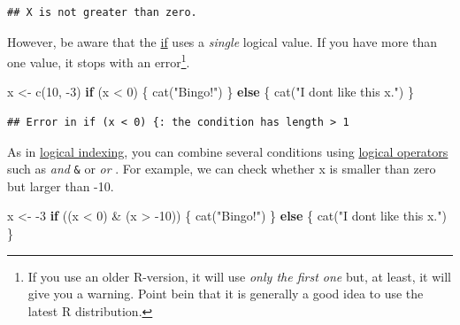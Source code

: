 \documentclass[
]{book}
\newenvironment{Shaded}{\begin{snugshade}}{\end{snugshade}}
\newcommand{\ControlFlowTok}[1]{\textcolor[rgb]{0.13,0.29,0.53}{\textbf{#1}}}
\newcommand{\DecValTok}[1]{\textcolor[rgb]{0.00,0.00,0.81}{#1}}
\newcommand{\FunctionTok}[1]{\textcolor[rgb]{0.00,0.00,0.00}{#1}}
\newcommand{\NormalTok}[1]{#1}
\newcommand{\OtherTok}[1]{\textcolor[rgb]{0.56,0.35,0.01}{#1}}
\newcommand{\SpecialCharTok}[1]{\textcolor[rgb]{0.00,0.00,0.00}{#1}}
\newcommand{\StringTok}[1]{\textcolor[rgb]{0.31,0.60,0.02}{#1}}
\begin{document}
\begin{verbatim}
## X is not greater than zero.
\end{verbatim}

However, be aware that the \href{https://stat.ethz.ch/R-manual/R-devel/library/base/html/Control.html}{if} uses a \emph{single} logical value. If you have more than one value, it stops with an error\footnote{If you use an older R-version, it will use \emph{only the first one} but, at least, it will give you a warning. Point bein that it is generally a good idea to use the latest R distribution.}.

\begin{Shaded}
\begin{Highlighting}[]
\NormalTok{x }\OtherTok{\textless{}{-}} \FunctionTok{c}\NormalTok{(}\DecValTok{10}\NormalTok{,  }\SpecialCharTok{{-}}\DecValTok{3}\NormalTok{)}
\ControlFlowTok{if}\NormalTok{ (x }\SpecialCharTok{\textless{}} \DecValTok{0}\NormalTok{) \{}
  \FunctionTok{cat}\NormalTok{(}\StringTok{"Bingo!"}\NormalTok{)}
\NormalTok{\} }\ControlFlowTok{else}\NormalTok{ \{}
  \FunctionTok{cat}\NormalTok{(}\StringTok{"I don\textquotesingle{}t like this x."}\NormalTok{)}
\NormalTok{\}}
\end{Highlighting}
\end{Shaded}

\begin{verbatim}
## Error in if (x < 0) {: the condition has length > 1
\end{verbatim}

As in \protect\hyperlink{logical-indexing}{logical indexing}, you can combine several conditions using \href{https://stat.ethz.ch/R-manual/R-devel/library/base/html/Logic.html}{logical operators} such as \emph{and} \texttt{\&} or \emph{or} \texttt{\textbar{}}. For example, we can check whether x is smaller than zero but larger than -10.

\begin{Shaded}
\begin{Highlighting}[]
\NormalTok{x }\OtherTok{\textless{}{-}} \SpecialCharTok{{-}}\DecValTok{3}
\ControlFlowTok{if}\NormalTok{ ((x }\SpecialCharTok{\textless{}} \DecValTok{0}\NormalTok{) }\SpecialCharTok{\&}\NormalTok{ (x }\SpecialCharTok{\textgreater{}} \SpecialCharTok{{-}}\DecValTok{10}\NormalTok{)) \{}
  \FunctionTok{cat}\NormalTok{(}\StringTok{"Bingo!"}\NormalTok{)}
\NormalTok{\} }\ControlFlowTok{else}\NormalTok{ \{}
  \FunctionTok{cat}\NormalTok{(}\StringTok{"I don\textquotesingle{}t like this x."}\NormalTok{)}
\NormalTok{\}}
\end{Highlighting}
\end{Shaded}
\end{document}
